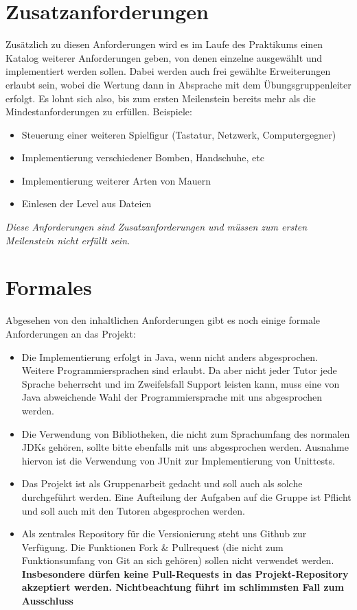 \documentclass{programmierpraktikum}
\begin{document}
\section{Zusatzanforderungen}
Zusätzlich zu diesen Anforderungen wird es im Laufe des Praktikums einen Katalog weiterer Anforderungen geben, von denen einzelne ausgewählt und implementiert werden sollen. Dabei werden auch frei gewählte Erweiterungen erlaubt sein, wobei die Wertung dann in Absprache mit dem Übungsgruppenleiter erfolgt. Es lohnt sich also, bis zum ersten Meilenstein bereits mehr als die Mindestanforderungen zu erfüllen.
Beispiele:
\begin{itemize}
  \item Steuerung einer weiteren Spielfigur (Tastatur, Netzwerk, Computergegner)
  \item Implementierung verschiedener Bomben, Handschuhe, etc
  \item Implementierung weiterer Arten von Mauern
  \item Einlesen der Level aus Dateien
\end{itemize}
\emph{Diese Anforderungen sind Zusatzanforderungen und müssen zum ersten Meilenstein nicht erfüllt sein.}
\section{Formales}
Abgesehen von den inhaltlichen Anforderungen gibt es noch einige formale Anforderungen an das Projekt:
\begin{itemize}
  \item Die Implementierung erfolgt in Java, wenn nicht anders abgesprochen. Wei\-te\-re Pro\-gram\-mier\-sprachen sind erlaubt. Da aber nicht jeder Tutor jede Sprache beherrscht und im Zweifelsfall Support leisten kann, muss eine von Java abweichende Wahl der Programmiersprache mit uns abgesprochen werden.
  \item Die Verwendung von Bibliotheken, die nicht zum Sprachumfang des normalen JDKs gehören, sollte bitte ebenfalls mit uns abgesprochen werden. Ausnahme hiervon ist die Verwendung von JUnit zur Implementierung von Unittests.
  \item Das Projekt ist als Gruppenarbeit gedacht und soll auch als solche durchgeführt werden. Eine Aufteilung der Aufgaben auf die Gruppe ist Pflicht und soll auch mit den Tutoren abgesprochen werden.
  \item Als zentrales Repository für die Versionierung steht uns Github zur Verfügung. Die Funktionen Fork \& Pullrequest (die nicht zum Funktionsumfang von Git an sich gehören) sollen nicht verwendet werden. \textbf{Insbesondere dürfen keine Pull-Requests in das Projekt-Repository akzeptiert werden. Nichtbeachtung führt im schlimmsten Fall zum Ausschluss}
\end{itemize}
\end{document}
